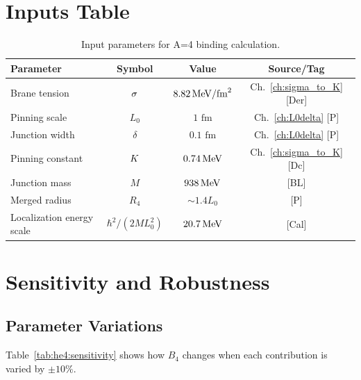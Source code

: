 \section{Inputs Table}
\label{sec:he4:inputs}

\begin{table}[h]
\centering
\caption{Input parameters for A=4 binding calculation.}
\label{tab:inputs}
\begin{tabular}{lccc}
    \toprule
    Parameter & Symbol & Value & Source/Tag \\
    \midrule
    Brane tension & $\sigma$ & $8.82\,\mathrm{MeV}/\text{fm}^2$ & Ch.~\ref{ch:sigma_to_K} [Der] \\
    Pinning scale & $L_0$ & $1\text{ fm}$ & Ch.~\ref{ch:L0delta} [P] \\
    Junction width & $\delta$ & $0.1\text{ fm}$ & Ch.~\ref{ch:L0delta} [P] \\
    Pinning constant & $K$ & $0.74\,\mathrm{MeV}$ & Ch.~\ref{ch:sigma_to_K} [Dc] \\
    \midrule
    Junction mass & $M$ & $938\,\mathrm{MeV}$ & [BL] \\
    Merged radius & $R_4$ & $\sim 1.4 L_0$ & [P] \\
    Localization energy scale & $\hbar^2/(2M L_0^2)$ & $20.7\,\mathrm{MeV}$ & [Cal] \\
    \bottomrule
\end{tabular}
\end{table}

\section{Sensitivity and Robustness}
\label{sec:he4:sensitivity}

\subsection{Parameter Variations}

Table~\ref{tab:he4:sensitivity} shows how $B_4$ changes when each contribution
is varied by $\pm 10\%$.

